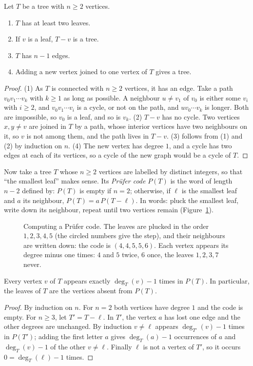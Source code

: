 \begin{lemma}\label{lem:trees}
Let $T$ be a tree with $n\ge2$ vertices.
\begin{enumerate}
\item $T$ has at least two leaves.
\item If $v$ is a leaf, $T-v$ is a tree.
\item $T$ has $n-1$ edges.
\item Adding a new vertex joined to one vertex of $T$ gives a tree.
\end{enumerate}
\end{lemma}
\begin{proof}
(1) As $T$ is connected with $n\ge2$ vertices, it has an edge. Take a path $v_0v_1\cdots v_k$ with $k\ge1$ as long as possible. A neighbour $u\ne v_1$
of $v_0$ is either some $v_i$ with $i\ge2$, and $v_0v_1\cdots v_i$ is a cycle, or not on the path, and $uv_0\cdots v_k$ is longer. Both are impossible, so
$v_0$ is a leaf, and so is $v_k$. (2) $T-v$ has no cycle. Two vertices $x,y\ne v$ are joined in $T$ by a path, whose interior vertices have
two neighbours on it, so $v$ is not among them, and the path lives in $T-v$. (3) follows from (1) and (2) by induction on $n$. (4) The
new vertex has degree $1$, and a cycle has two edges at each of its vertices, so a cycle of the new graph would be a cycle of $T$.
\end{proof}

Now take a tree $T$ whose $n\ge2$ vertices are labelled by distinct integers, so that ``the smallest leaf'' makes sense. Its
\emph{Pr\"ufer code} $P(T)$ is the word of length $n-2$ defined by: $P(T)$ is empty if $n=2$; otherwise, if $\ell$ is the smallest leaf and $a$ its
neighbour, $P(T)=a\,P(T-\ell)$. In words: pluck the smallest leaf, write down its neighbour, repeat until two vertices remain
(Figure~\ref{fig:prufer}).

\begin{figure}[ht]
\centering
{}
\caption{Computing a Pr\"ufer code. The leaves are plucked in the order $1,2,3,4,5$ (the circled numbers give the step), and
their neighbours are written down: the code is $(4,4,5,5,6)$. Each vertex appears its degree minus one times: $4$ and $5$ twice,
$6$ once, the leaves $1,2,3,7$ never.}
\label{fig:prufer}
\end{figure}

\begin{lemma}\label{lem:pruferdeg}
Every vertex $v$ of $T$ appears exactly $\deg_T(v)-1$ times in $P(T)$. In particular, the leaves of $T$ are the vertices absent from $P(T)$.
\end{lemma}
\begin{proof}
By induction on $n$. For $n=2$ both vertices have degree $1$ and the code is empty. For $n\ge3$, let $T'=T-\ell$. In $T'$, the vertex $a$ has
lost one edge and the other degrees are unchanged. By induction $v\ne\ell$ appears $\deg_{T'}(v)-1$ times in $P(T')$; adding the first
letter $a$ gives $\deg_T(a)-1$ occurrences of $a$ and $\deg_T(v)-1$ of the other $v\ne\ell$. Finally $\ell$ is not a vertex of $T'$, so it occurs
$0=\deg_T(\ell)-1$ times.
\end{proof}

